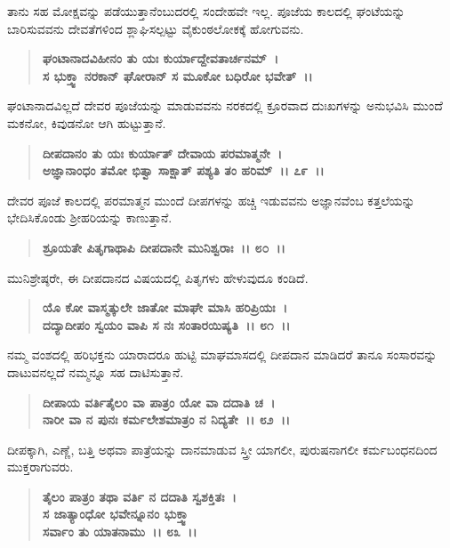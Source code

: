 ತಾನು ಸಹ ಮೋಕ್ಷವನ್ನು ಪಡೆಯುತ್ತಾನೆಂಬುದರಲ್ಲಿ ಸಂದೇಹವೇ ಇಲ್ಲ. ಪೂಜೆಯ ಕಾಲದಲ್ಲಿ ಘಂಟೆಯನ್ನು ಬಾರಿಸುವವನು ದೇವತೆಗಳಿಂದ ಶ್ಲಾಘಿಸಲ್ಪಟ್ಟು ವೈಕುಂಠಲೋಕಕ್ಕೆ ಹೋಗುವನು.

\begin{verse}
\textbf{ಘಂಟಾನಾದವಿಹೀನಂ ತು ಯಃ ಕುರ್ಯಾದ್ದೇವತಾರ್ಚನಮ್~।}\\\textbf{ಸ ಭುಕ್ತ್ವಾ ನರಕಾನ್ ಘೋರಾನ್ ಸ ಮೂಕೋ ಬಧಿರೋ ಭವೇತ್~।।}
\end{verse}

ಘಂಟಾನಾದವಿಲ್ಲದೆ ದೇವರ ಪೂಜೆಯನ್ನು ಮಾಡುವವನು ನರಕದಲ್ಲಿ ಕ್ರೂರವಾದ ದುಃಖಗಳನ್ನು ಅನುಭವಿಸಿ ಮುಂದೆ ಮಕನೋ, ಕಿವುಡನೋ ಆಗಿ ಹುಟ್ಟುತ್ತಾನೆ.

\begin{verse}
\textbf{ದೀಪದಾನಂ ತು ಯಃ ಕುರ್ಯಾತ್ ದೇವಾಯ ಪರಮಾತ್ಮನೇ~।}\\\textbf{ಅಜ್ಞಾನಾಂಧಂ ತಮೋ ಭಿತ್ವಾ ಸಾಕ್ಷಾತ್ ಪಶ್ಯತಿ ತಂ ಹರಿಮ್~।। ೭೯~।।}
\end{verse}

ದೇವರ ಪೂಜೆ ಕಾಲದಲ್ಲಿ ಪರಮಾತ್ಮನ ಮುಂದೆ ದೀಪಗಳನ್ನು ಹಚ್ಚಿ ಇಡುವವನು ಅಜ್ಞಾನ\-ವೆಂಬ ಕತ್ತಲೆಯನ್ನು ಭೇದಿಸಿಕೊಂಡು ಶ‍್ರೀಹರಿಯನ್ನು ಕಾಣುತ್ತಾನೆ.

\begin{verse}
\textbf{ಶ್ರೂಯತೇ ಪಿತೃಗಾಥಾಪಿ ದೀಪದಾನೇ ಮುನಿಶ್ವರಾಃ~।। ೮೦~।।}
\end{verse}

ಮುನಿಶ್ರೇಷ್ಠರೇ, ಈ ದೀಪದಾನದ ವಿಷಯದಲ್ಲಿ ಪಿತೃಗಳು ಹೇಳುವುದೂ ಕಂಡಿದೆ.

\begin{verse}
\textbf{ಯೊ ಕೋ ವಾಸ್ಮತ್ಕುಲೇ ಜಾತೋ ಮಾಘೇ ಮಾಸಿ ಹರಿಪ್ರಿಯಃ~।}\\\textbf{ದದ್ಯಾದೀಪಂ ಸ್ವಯಂ ವಾಪಿ ಸ ನಃ ಸಂತಾರಯಿಷ್ಯತಿ~।। ೮೧~।।}
\end{verse}

ನಮ್ಮ ವಂಶದಲ್ಲಿ ಹರಿಭಕ್ತನು ಯಾರಾದರೂ ಹುಟ್ಟಿ ಮಾಘಮಾಸದಲ್ಲಿ ದೀಪದಾನ ಮಾಡಿದರೆ ತಾನೂ ಸಂಸಾರವನ್ನು ದಾಟುವನಲ್ಲದೆ ನಮ್ಮನ್ನೂ ಸಹ ದಾಟಿಸುತ್ತಾನೆ.

\begin{verse}
\textbf{ದೀಪಾಯ ವರ್ತಿತೈಲಂ ವಾ ಪಾತ್ರಂ ಯೋ ವಾ ದದಾತಿ ಚ~।}\\\textbf{ನಾರೀ ವಾ ನ ಪುನಃ ಕರ್ಮಲೇಶಮಾತ್ರಂ ನ ನಿದ್ಯತೇ~।। ೮೨~।।}
\end{verse}

ದೀಪಕ್ಕಾಗಿ, ಎಣ್ಣೆ, ಬತ್ತಿ ಅಥವಾ ಪಾತ್ರೆಯನ್ನು ದಾನಮಾಡುವ ಸ್ತ್ರೀ ಯಾಗಲೀ, ಪುರುಷನಾಗಲೀ ಕರ್ಮಬಂಧನದಿಂದ ಮುಕ್ತರಾಗುವರು.

\begin{verse}
\textbf{ತೈಲಂ ಪಾತ್ರಂ ತಥಾ ವರ್ತಿ ನ ದದಾತಿ ಸ್ವಶಕ್ತಿತಃ~। }\\\textbf{ಸ ಜಾತ್ಯಾಂಧೋ ಭವೇನ್ನೂನಂ ಭುಕ್ತ್ವಾ}\\\textbf{ ಸರ್ವಾಂ ತು ಯಾತನಾಮು~।। ೮೩~।।}
\end{verse}

